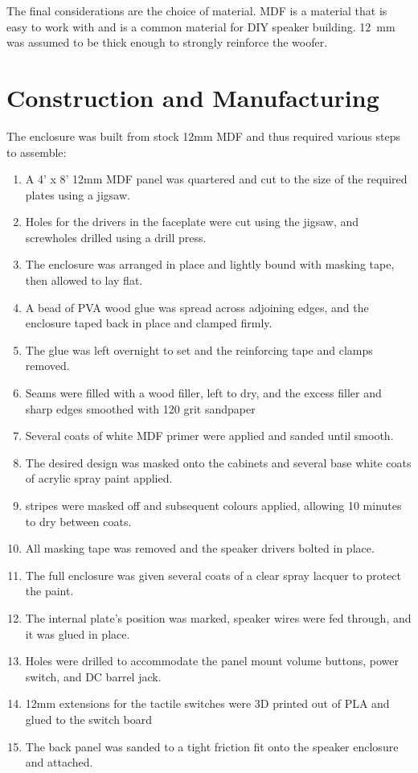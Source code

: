 \documentclass[main.tex]{subfiles}
\begin{document}
The final considerations are the choice of material.
MDF is a material that is easy to work with and is a common material for DIY speaker building.
\SI{12}{\milli\metre} was assumed to be thick enough to strongly reinforce the woofer.
\section{Construction and Manufacturing}

The enclosure was built from stock 12mm MDF and thus required various steps to assemble:

\begin{enumerate}
    \item A 4' x 8' 12mm MDF panel was quartered and cut to the size of the required plates using a jigsaw.
    \item Holes for the drivers in the faceplate were cut using the jigsaw, and screwholes drilled using a drill press.
    \item The enclosure was arranged in place and lightly bound with masking tape, then allowed to lay flat.
    \item A bead of PVA wood glue was spread across adjoining edges, and the enclosure taped back in place and clamped firmly.
    \item The glue was left overnight to set and the reinforcing tape and clamps removed.
    \item Seams were filled with a wood filler, left to dry, and the excess filler and sharp edges smoothed with 120 grit sandpaper
    \item Several coats of white MDF primer were applied and sanded until smooth.
    \item The desired design was masked onto the cabinets and several base white coats of acrylic spray paint applied.
    \item stripes were masked off and subsequent colours applied, allowing 10 minutes to dry between coats.
    \item All masking tape was removed and the speaker drivers bolted in place.
    \item The full enclosure was given several coats of a clear spray lacquer to protect the paint.
    \item The internal plate's position was marked, speaker wires were fed through, and it was glued in place.
    \item Holes were drilled to accommodate the panel mount volume buttons, power switch, and DC barrel jack.
    \item 12mm extensions for the tactile switches were 3D printed out of PLA and glued to the switch board
    \item The back panel was sanded to a tight friction fit onto the speaker enclosure and attached.
\end{enumerate}
\end{document}
